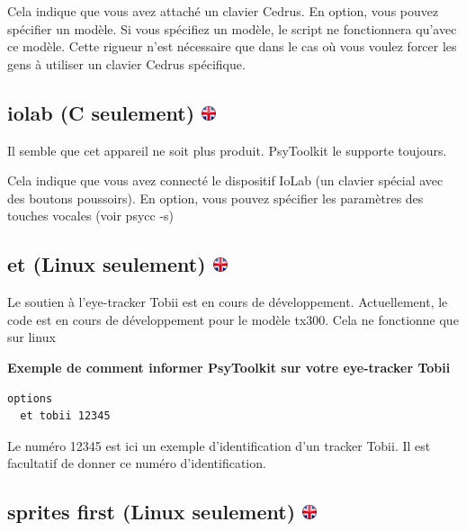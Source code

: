 \documentclass[
]{book}
\begin{document}
Cela indique que vous avez attaché un clavier Cedrus. En option, vous pouvez spécifier un modèle. Si vous spécifiez un modèle, le script ne fonctionnera qu'avec ce modèle. Cette rigueur n'est nécessaire que dans le cas où vous voulez forcer les gens à utiliser un clavier Cedrus spécifique.

\hypertarget{iolab-c-seulement}{%
\subsection[iolab (C seulement) ]{\texorpdfstring{iolab (C seulement) \href{https://www.psytoolkit.org/doc3.4.0/syntax.html\#options-iolab}{\protect\includegraphics{img/ukflag.png}}}{iolab (C seulement) }}\label{iolab-c-seulement}}

Il semble que cet appareil ne soit plus produit. PsyToolkit le supporte toujours.

Cela indique que vous avez connecté le dispositif IoLab (un clavier spécial avec des boutons poussoirs). En option, vous pouvez spécifier les paramètres des touches vocales (voir psycc -s)

\hypertarget{et-linux-seulement}{%
\subsection[et (Linux seulement) ]{\texorpdfstring{et (Linux seulement) \href{https://www.psytoolkit.org/doc3.4.0/syntax.html\#options-et}{\protect\includegraphics{img/ukflag.png}}}{et (Linux seulement) }}\label{et-linux-seulement}}

Le soutien à l'eye-tracker Tobii est en cours de développement. Actuellement, le code est en cours de développement pour le modèle tx300. Cela ne fonctionne que sur linux

\textbf{Exemple de comment informer PsyToolkit sur votre eye-tracker Tobii}

\begin{verbatim}
options
  et tobii 12345
\end{verbatim}

Le numéro 12345 est ici un exemple d'identification d'un tracker Tobii. Il est facultatif de donner ce numéro d'identification.

\hypertarget{sprites-first-linux-seulement}{%
\subsection[sprites first (Linux seulement) ]{\texorpdfstring{sprites first (Linux seulement) \href{https://www.psytoolkit.org/doc3.4.0/syntax.html\#options-sprites-first}{\protect\includegraphics{img/ukflag.png}}}{sprites first (Linux seulement) }}\label{sprites-first-linux-seulement}}
\end{document}
